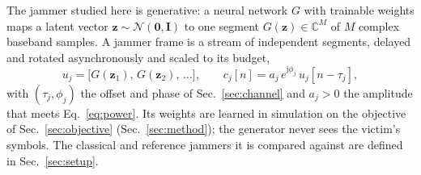 The jammer studied here is generative: a neural network $G$ with trainable weights maps a latent vector $\mathbf{z}\sim\mathcal{N}(\mathbf{0},\mathbf{I})$ to one segment $G(\mathbf{z})\in\mathbb{C}^{M}$ of $M$ complex baseband samples.
A jammer frame is a stream of independent segments, delayed and rotated asynchronously and scaled to its budget,
\begin{equation}
u_j=\bigl[G(\mathbf{z}_1),\,G(\mathbf{z}_2),\,\ldots\bigr],\qquad c_j[n]=a_j\,e^{\mathrm{j}\phi_j}\,u_j[n-\tau_j],
\label{eq:gan}
\end{equation}
with $(\tau_j,\phi_j)$ the offset and phase of Sec.~\ref{sec:channel} and $a_j>0$ the amplitude that meets Eq.~\eqref{eq:power}.
Its weights are learned in simulation on the objective of Sec.~\ref{sec:objective} (Sec.~\ref{sec:method}); the generator never sees the victim's symbols.
The classical and reference jammers it is compared against are defined in Sec.~\ref{sec:setup}.

